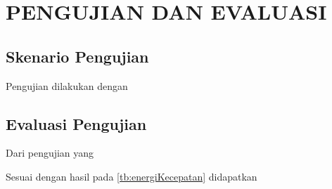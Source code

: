 \chapter{PENGUJIAN DAN EVALUASI}
\vspace{4ex}

\setlength{\parindent}{7ex}


\section{Skenario Pengujian}
\vspace{1ex}

Pengujian dilakukan dengan \lipsum[1]
\vspace{0.5ex}

\section{Evaluasi Pengujian}
\vspace{1ex}

Dari pengujian yang \lipsum[2]
\vspace{0.5ex}

Sesuai dengan hasil pada \ref{tb:energiKecepatan} didapatkan \lipsum[3]


\vspace{1ex}

\lipsum[4]
\vspace{0.5ex}